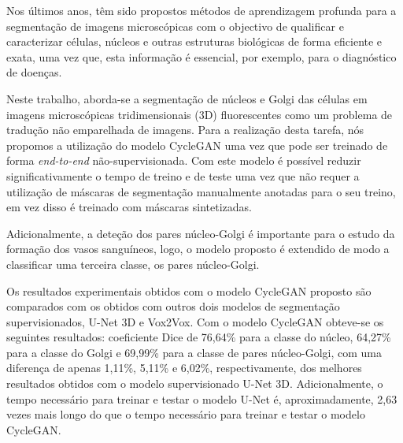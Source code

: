 \acresetall
\noindent Nos últimos anos, têm sido propostos métodos de aprendizagem profunda para a segmentação de imagens microscópicas com o objectivo de qualificar e caracterizar células, núcleos e outras estruturas biológicas de forma eficiente e exata, uma vez que, esta informação é essencial, por exemplo, para o diagnóstico de doenças.

Neste trabalho, aborda-se a segmentação de núcleos e Golgi das células em imagens microscópicas tridimensionais (3D) fluorescentes como um problema de tradução não emparelhada de imagens. Para a realização desta tarefa, nós propomos a utilização do modelo CycleGAN uma vez que pode ser treinado de forma \textit{end-to-end} não-supervisionada. Com este modelo é possível reduzir significativamente o tempo de treino e de teste uma vez que não requer a utilização de máscaras de segmentação manualmente anotadas para o seu treino, em vez disso é treinado com máscaras sintetizadas.

Adicionalmente, a deteção dos pares núcleo-Golgi é importante para o estudo da formação dos vasos sanguíneos, logo, o modelo proposto é extendido de modo a classificar uma terceira classe, os pares núcleo-Golgi.

Os resultados experimentais obtidos com o modelo CycleGAN proposto são comparados com os obtidos com outros dois modelos de segmentação supervisionados, U-Net 3D e Vox2Vox. Com o modelo CycleGAN obteve-se os seguintes resultados: coeficiente Dice de 76,64\% para a classe do núcleo, 64,27\% para a classe do Golgi e 69,99\% para a classe de pares núcleo-Golgi, com uma diferença de apenas 1,11\%, 5,11\% e 6,02\%, respectivamente, dos melhores resultados obtidos com o modelo supervisionado U-Net 3D. Adicionalmente, o tempo necessário para treinar e testar o modelo U-Net é, aproximadamente, 2,63 vezes mais longo do que o tempo necessário para treinar e testar o modelo CycleGAN.



